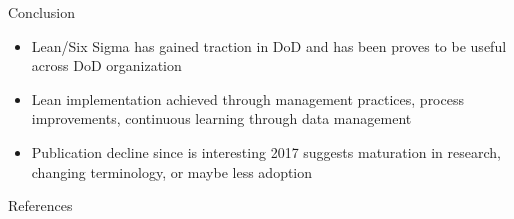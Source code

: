 \documentclass[aspectratio=169,11pt,xcolor={dvipsnames},hyperref={pdftex,pdfpagemode=UseNone,hidelinks,pdfdisplaydoctitle=true},usepdftitle=false]{beamer}
\begin{document}
      \begin{frame}{Conclusion}
        \begin{itemize}
          \item Lean/Six Sigma has gained traction in DoD and has been proves to be useful across DoD organization
          \item Lean implementation achieved through management practices, process improvements, continuous learning through data management
          \item Publication decline since is interesting 2017 suggests maturation in research, changing terminology, or maybe less adoption
        \end{itemize}
      \end{frame}

      \begin{frame}[allowframebreaks]{References}
        \footnotesize %
        
        
      \end{frame}
      
      \lastslide
\end{document}

